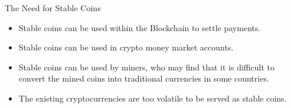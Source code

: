 \documentclass[notes=show, beamer, handout]{beamer}
\begin{document}
%




\begin{frame}{The Need for Stable Coins}


\begin{itemize}
\item Stable coins can be used within the Blockchain to settle payments.
\item Stable coins can be used in crypto money market accounts.
\item Stable coins can be used by miners, who may find that it is difficult to convert the mined coins into traditional currencies in some countries.
\item The existing cryptocurrencies are too volatile to be served as stable coins.
\end{itemize}
\end{frame}
\end{document}
